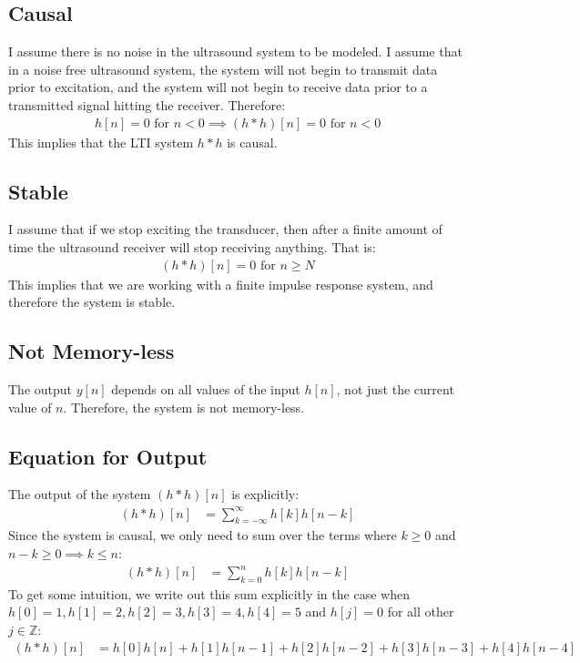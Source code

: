 \documentclass[a4paper]{article}
\begin{document}
\subsection*{Causal}
I assume there is no noise in the ultrasound system to be modeled. I assume that in a noise free ultrasound system, the system will not begin to transmit data prior to excitation, and the system will not begin to receive data prior to a transmitted signal hitting the receiver. Therefore:
\begin{align*}
h[n] = 0 \text{ for } n < 0 \implies (h*h)[n] = 0 \text{ for } n < 0 
\end{align*}
This implies that the LTI system  $h*h$ is causal. 
\subsection*{Stable}
I assume that if we stop exciting the transducer, then after a finite amount of time the ultrasound receiver will stop receiving anything. That is:
\begin{align*}
(h*h)[n] = 0 \text{ for } n \geq N
\end{align*}
This implies that we are working with a finite impulse response system, and therefore the system is stable.
\subsection*{Not Memory-less}
The output $y[n]$ depends on all values of the input $h[n]$, not just the current value of $n$. Therefore, the system is not memory-less.
\subsection*{Equation for Output}
The output of the system $(h*h)[n]$ is explicitly:
\begin{align*}
(h*h)[n] &= \sum_{k=-\infty}^{\infty}h[k]h[n-k]
\end{align*}
Since the system is causal, we only need to sum over the terms where $k \geq 0$ and $n - k \geq 0 \implies k \leq n$:
\begin{align*}
(h*h)[n] &= \sum_{k=0}^{n}h[k]h[n-k]
\end{align*}
To get some intuition, we write out this sum explicitly in the case when $h[0] = 1, h[1] = 2, h[2] = 3, h[3] = 4, h[4] = 5$ and $h[j] = 0$ for all other $j \in \mathbb{Z}$:
\begin{align*}
(h*h)[n] &= h[0]h[n] + h[1]h[n-1] + h[2]h[n-2] + h[3]h[n-3] + h[4]h[n-4]
\end{align*}
\clearpage
\end{document}
